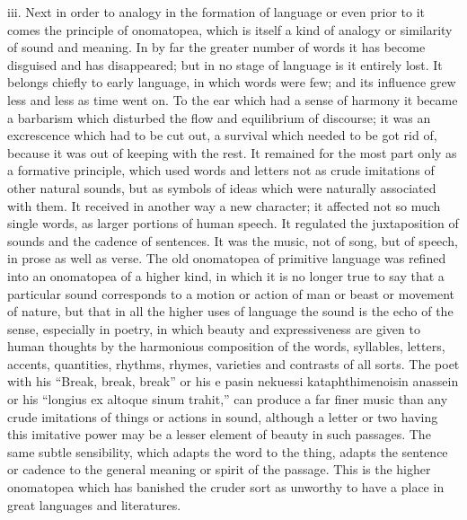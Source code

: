 \documentclass[11pt,letter]{article}
\begin{document}
\par  iii. Next in order to analogy in the formation of language or even prior to it comes the principle of onomatopea, which is itself a kind of analogy or similarity of sound and meaning. In by far the greater number of words it has become disguised and has disappeared; but in no stage of language is it entirely lost. It belongs chiefly to early language, in which words were few; and its influence grew less and less as time went on. To the ear which had a sense of harmony it became a barbarism which disturbed the flow and equilibrium of discourse; it was an excrescence which had to be cut out, a survival which needed to be got rid of, because it was out of keeping with the rest. It remained for the most part only as a formative principle, which used words and letters not as crude imitations of other natural sounds, but as symbols of ideas which were naturally associated with them. It received in another way a new character; it affected not so much single words, as larger portions of human speech. It regulated the juxtaposition of sounds and the cadence of sentences. It was the music, not of song, but of speech, in prose as well as verse. The old onomatopea of primitive language was refined into an onomatopea of a higher kind, in which it is no longer true to say that a particular sound corresponds to a motion or action of man or beast or movement of nature, but that in all the higher uses of language the sound is the echo of the sense, especially in poetry, in which beauty and expressiveness are given to human thoughts by the harmonious composition of the words, syllables, letters, accents, quantities, rhythms, rhymes, varieties and contrasts of all sorts. The poet with his “Break, break, break” or his e pasin nekuessi kataphthimenoisin anassein or his “longius ex altoque sinum trahit,” can produce a far finer music than any crude imitations of things or actions in sound, although a letter or two having this imitative power may be a lesser element of beauty in such passages. The same subtle sensibility, which adapts the word to the thing, adapts the sentence or cadence to the general meaning or spirit of the passage. This is the higher onomatopea which has banished the cruder sort as unworthy to have a place in great languages and literatures.
\end{document}
